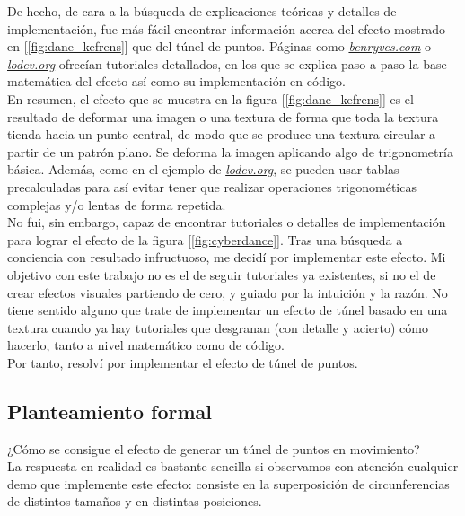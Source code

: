 De hecho, de cara a la búsqueda de explicaciones teóricas y detalles de implementación, fue más fácil encontrar información acerca del efecto mostrado en [\ref{fig:dane_kefrens}] que del túnel de puntos. Páginas como \emph{\href{http://benryves.com/tutorials/tunnel}{benryves.com}} o \emph{\href{https://lodev.org/cgtutor/tunnel.html}{lodev.org}} ofrecían tutoriales detallados, en los que se explica paso a paso la base matemática del efecto así como su implementación en código.\\

En resumen, el efecto que se muestra en la figura [\ref{fig:dane_kefrens}] es el resultado de deformar una imagen o una textura de forma que toda la textura tienda hacia un punto central, de modo que se produce una textura circular a partir de un patrón plano. Se deforma la imagen aplicando algo de trigonometría básica. Además, como en el ejemplo de \emph{\href{https://lodev.org/cgtutor/tunnel.html}{lodev.org}}, se pueden usar tablas precalculadas para así evitar tener que realizar operaciones trigonométicas complejas y/o lentas de forma repetida.\\

No fui, sin embargo, capaz de encontrar tutoriales o detalles de implementación para lograr el efecto de la figura [\ref{fig:cyberdance}]. Tras una búsqueda a conciencia con resultado infructuoso, me decidí por implementar este efecto. Mi objetivo con este trabajo no es el de seguir tutoriales ya existentes, si no el de crear efectos visuales partiendo de cero, y guiado por la intuición y la razón. No tiene sentido alguno que trate de implementar un efecto de túnel basado en una textura cuando ya hay tutoriales que desgranan (con detalle y acierto) cómo hacerlo, tanto a nivel matemático como de código.\\

Por tanto, resolví por implementar el efecto de túnel de puntos.

\subsection{Planteamiento formal}

¿Cómo se consigue el efecto de generar un túnel de puntos en movimiento?\\

La respuesta en realidad es bastante sencilla si observamos con atención cualquier demo que implemente este efecto: consiste en la superposición de circunferencias de distintos tamaños y en distintas posiciones. \\

